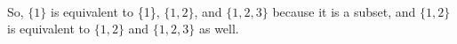 \documentclass[a4paper,12pt]{book}
\newcounter{question}
\begin{document}
{\begin{introNOHEAD}{\ }
\begin{center}
        \end{center}

        So, $\{1\}$ is equivalent to \{1\}, $\{1, 2\}$, and $\{1, 2, 3\}$ because it is a subset,
        and $\{1, 2\}$ is equivalent to $\{1, 2\}$ and $\{1, 2, 3\}$ as well.
        
    \end{introNOHEAD}
    \newpage
    }{}


\end{document}
